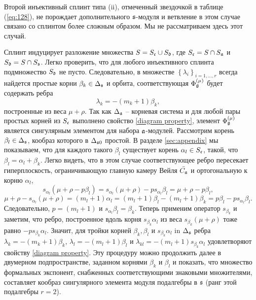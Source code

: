 Второй инъективный сплинт типа (ii), отмеченный звездочкой в таблице (\ref{eq:128}), не порождает дополнительного $\mathfrak{s}$-модуля и ветвление в этом случае связано со сплинтом более сложным образом. Мы не рассматриваем здесь этот случай.

Сплинт индуцирует разложение множества $S=S_{\frak{c}}\cup S_{\frak{d}}$, где $S_{\frak{c}}=S\cap S_{\mathfrak{a}}$ и $S_{\frak{d}}=S\cap S_{\mathfrak{s}}$.  Легко проверить, что для любого инъективного сплинта подмножество  $S_{\frak{d}}$ не пусто. Следовательно, в множестве $\left\{ \lambda
_{i}\right\} _{i=1,\dots ,r}$ всегда найдется простые корни $\beta_{k}\in \Delta _{\mathfrak{s}}$ и орбита, соответствующая $\Phi _{\mathfrak{g}}^{\left( \mu \right) }$ будет содержать ребра
\begin{equation}
\lambda _{k}=-\left( m_{k}+1\right) \beta _{k}  \label{beta edge},
\end{equation}
построенные из веса  $\mu +\rho $.  Так как $\Delta _{\mathfrak{a}}$ -- корневая система и для любой пары простых корней из $S_{\frak{c}}$ выполнено свойство \ref{diagram property}, элемент  $\Phi _{\mathfrak{g}}^{\left( \mu \right) }$ является сингулярным элементом для набора  $\mathfrak{a}$-модулей. Рассмотрим корень $\beta _{l}\in \Delta _{\mathfrak{s}}$, кообраз которого в  $\Delta _{\mathfrak{s}0}$  простой. В разделе \ref{sec:appendix} мы показываем, что для каждого такого $\beta _{l}$ существует корень  $\alpha _{l}\in S_{\frak{c}}$, такой, что $\beta _{l}=\alpha _{l}+\beta _{k}$. Легко видеть, что в этом случае соответствующее ребро пересекает гиперплоскость, ограничивающую главную камеру Вейля $\bar{C_{\mathfrak{a}}}$ и ортогональную к корню $\alpha _{l}$,
\begin{equation}
s_{\alpha _{l}}\left( \mu +\rho -p\beta _{l}\right) =s_{\alpha _{l}}\left(
\mu +\rho \right) -ps_{\alpha _{l}}\beta _{l}=\mu +\rho -p\beta _{l},
\label{intersection}
\end{equation}
\begin{equation}
\mu +\rho -s_{\alpha _{l}}\left( \mu +\rho \right) =\left( m_{l}+1\right)
\alpha _{l}=\left( m_{l}+1\right) \beta _{l}-\left( m_{l}+1\right) \beta
_{k}=p\beta _{l}-ps_{\alpha _{l}}\beta _{l}.  
\label{intersection-2}
\end{equation}
Следовательно,  $p=\left( m_{l}+1\right) $ и  $s_{\alpha _{l}}\beta_{l}=\beta _{k}$. Теперь применим оператор $s_{\beta _{k}}$ и заметим, что ребро, построенное вдоль корня $s_{\beta _{k}}\alpha _{l}$ из веса $s_{\beta _{k}}(\mu +\rho )$ тоже равно $-ps_{\beta _{k}}\alpha _{l}$. Значит, для тройки корней  $\beta _{k},\beta _{l}$ и $s_{\beta _{k}}\alpha _{l}$ in $\Delta _{\mathfrak{s}}$ ребра $\lambda_{k}=-\left( m_{k}+1\right) \beta _{k}$, $\lambda _{l}=-\left(m_{l}+1\right) \beta _{l}$ и $\lambda _{kl}=-\left( m_{l}+1\right)s_{\beta _{k}}\alpha _{l}$ удовлетворяют свойству \ref{diagram property}.
Эту процедуру можно продолжить далее в двумерном подпространстве, заданном корнями $\beta _{k}$ и $\beta _{l}$ и показать, что множество формальных экспонент, снабженных соответствующими знаковыми множителями, составляет кообраз сингулярного элемента модуля подалгебры в  $\frak{
s}$ (ранг этой подалгебры $r=2$).


